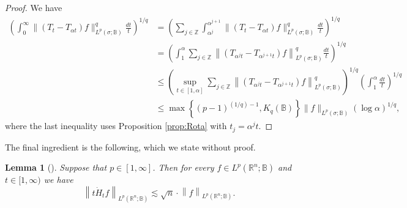 \documentclass[11pt,reqno]{amsart}
\newtheorem{lemma}[theorem]{Lemma}
\newcommand{\Z}{\mathbb{Z}}
\newcommand{\1}{\mathbf 1}
\newcommand{\R}{\mathbb{R}}
\newcommand{\Norm}[2]{\|#1\|_{#2}}
\begin{document}
\begin{proof} We have
	\begin{align*}\label{eq:sum to integral}
		\left(\int_0^\infty\Norm{(T_t-T_{\alpha t})f}{L^p(\sigma;\mathbb{B})}^q\frac{d t}{t}\right)^{1/q}
		&=\left(\sum_{j\in\Z}\int_{\alpha^j}^{\alpha^{j+1}}\Norm{(T_t-T_{\alpha t})f}{L^p(\sigma;\mathbb{B})}^q\frac{d t}{t}\right)^{1/q} \\
		&=\left(\int_{1}^{\alpha}\sum_{j\in\Z}\left\|(T_{\alpha^j t}-T_{\alpha^{j+1} t})f\right\|_{L^p(\sigma;\mathbb{B})}^q\frac{d t}{t}\right)^{1/q}\\
		&\le \left(\sup_{t\in [1,\alpha]}\sum_{j\in\Z}\left\|(T_{\alpha^j t}-T_{\alpha^{j+1} t})f\right\|_{L^p(\sigma;\mathbb{B})}^q\right)^{1/q}\left(\int_{1}^{\alpha}\frac{d t}{t}\right)^{1/q}\\
		&
		\le \max\left\{\left(p-1\right)^{(1/q)-1},K_q\left(\mathbb{B}\right)\right\}\Norm{f}{L^p(\sigma;\mathbb{B})}\left(\log\alpha\right)^{1/q},
	\end{align*}
	where the last inequality uses Proposition \ref{prop:Rota} with $t_j=\alpha^j t$.
\end{proof}

The final ingredient is the following, which we state without proof.
\begin{lemma}[{\cite[Lemma 27]{hytonen2019heat}}]\label{lem:n-heat-time-deriv}
	Suppose that $p\in [1,\infty]$. Then for every $f\in L^p(\R^n;\mathbb{B})$ and $t\in [1,\infty)$ we have
	$$
	\left\|t\dot{H}_tf\right\|_{L^p(\R^n;\mathbb{B})}\lesssim \sqrt{n}\cdot \left\|f\right\|_{L^p(\R^n;\mathbb{B})}.
	$$
\end{lemma}
\end{document}

